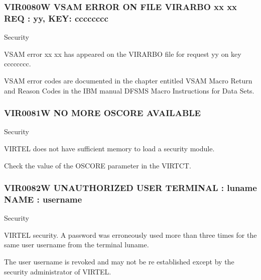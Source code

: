 \documentclass[letterpaper,10pt,english]{sphinxmanual}
\begin{document}
\subsubsection{VIR0080W VSAM ERROR ON FILE VIRARBO xx xx REQ : yy, KEY: cccccccc}
\label{\detokenize{messages:vir0080w-vsam-error-on-file-virarbo-xx-xx-req-yy-key-cccccccc}}\begin{description}
\sphinxAtStartPar
Security

\sphinxAtStartPar
VSAM error xx xx has appeared on the VIRARBO file for request yy on key cccccccc.

\sphinxAtStartPar
VSAM error codes are documented in the chapter entitled VSAM Macro Return and Reason Codes in the IBM manual DFSMS Macro Instructions for Data Sets.

\end{description}


\subsubsection{VIR0081W NO MORE OSCORE AVAILABLE}
\label{\detokenize{messages:vir0081w-no-more-oscore-available}}\begin{description}
\sphinxAtStartPar
Security

\sphinxAtStartPar
VIRTEL does not have sufficient memory to load a security module.

\sphinxAtStartPar
Check the value of the OSCORE parameter in the VIRTCT.

\end{description}


\subsubsection{VIR0082W UNAUTHORIZED USER TERMINAL : luname NAME : username}
\label{\detokenize{messages:vir0082w-unauthorized-user-terminal-luname-name-username}}\begin{description}
\sphinxAtStartPar
Security

\sphinxAtStartPar
VIRTEL security. A password was erroneously used more than three times for the same user username from the terminal luname.

\sphinxAtStartPar
The user username is revoked and may not be re established except by the security administrator of VIRTEL.

\end{description}
\end{document}
